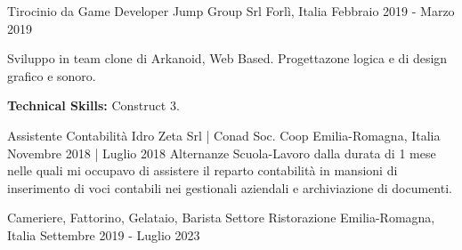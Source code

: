 

\begin{cventries}

    \cventry
    {Tirocinio da Game Developer} %
    {Jump Group Srl} %
    {Forlì, Italia} %
    {Febbraio 2019 - Marzo 2019} %
    {
      \begin{cvitems} %
        \item {Sviluppo in team clone di Arkanoid, Web Based. Progettazone logica e di design grafico e sonoro.}
        \item {\textbf{Technical Skills:} Construct 3.}
      \end{cvitems}
    }

    \cventry
    {Assistente Contabilità} %
    {Idro Zeta Srl | Conad Soc. Coop} %
    {Emilia-Romagna, Italia} %
    {Novembre 2018 | Luglio 2018} %
    {Alternanze Scuola-Lavoro dalla durata di 1 mese nelle quali mi occupavo di assistere il reparto contabilità in mansioni di inserimento di voci contabili nei gestionali aziendali e archiviazione di documenti.}

    \cventry
    {Cameriere, Fattorino, Gelataio, Barista} %
    {Settore Ristorazione} %
    {Emilia-Romagna, Italia} %
    {Settembre 2019 - Luglio 2023} %
    {}

\end{cventries}
